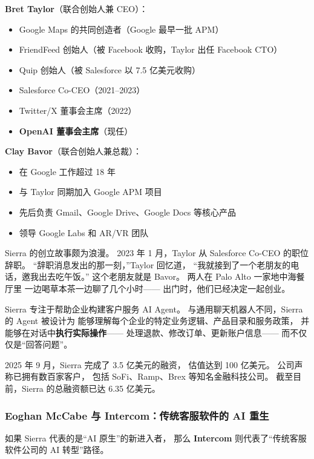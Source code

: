 \begin{corebox}
\textbf{Bret Taylor}（联合创始人兼 CEO）：
\begin{itemize}[noitemsep]
  \item Google Maps 的共同创造者（Google 最早一批 APM）
  \item FriendFeed 创始人（被 Facebook 收购，Taylor 出任 Facebook CTO）
  \item Quip 创始人（被 Salesforce 以 7.5 亿美元收购）
  \item Salesforce Co-CEO（2021--2023）
  \item Twitter/X 董事会主席（2022）
  \item \textbf{OpenAI 董事会主席}（现任）
\end{itemize}

\textbf{Clay Bavor}（联合创始人兼总裁）：
\begin{itemize}[noitemsep]
  \item 在 Google 工作超过 18 年
  \item 与 Taylor 同期加入 Google APM 项目
  \item 先后负责 Gmail、Google Drive、Google Docs 等核心产品
  \item 领导 Google Labs 和 AR/VR 团队
\end{itemize}
\end{corebox}

Sierra 的创立故事颇为浪漫。
2023 年 1 月，Taylor 从 Salesforce Co-CEO 的职位辞职。
``辞职消息发出的那一刻，''Taylor 回忆道，
``我就接到了一个老朋友的电话，邀我出去吃午饭。''
这个老朋友就是 Bavor。
两人在 Palo Alto 一家地中海餐厅里
一边喝草本茶一边聊了几个小时——
出门时，他们已经决定一起创业。

Sierra 专注于帮助企业构建客户服务 AI Agent。
与通用聊天机器人不同，Sierra 的 Agent 被设计为
能够理解每个企业的特定业务逻辑、产品目录和服务政策，
并能够在对话中\textbf{执行实际操作}——
处理退款、修改订单、更新账户信息——
而不仅仅是``回答问题''。

2025 年 9 月，Sierra 完成了 3.5 亿美元的融资，
估值达到 100 亿美元。
公司声称已拥有数百家客户，
包括 SoFi、Ramp、Brex 等知名金融科技公司。
截至目前，Sierra 的总融资额已达 6.35 亿美元。

\subsubsection{Eoghan McCabe 与 Intercom：传统客服软件的 AI 重生}

如果 Sierra 代表的是``AI 原生''的新进入者，
那么 \textbf{Intercom} 则代表了``传统客服软件公司的 AI 转型''路径。

